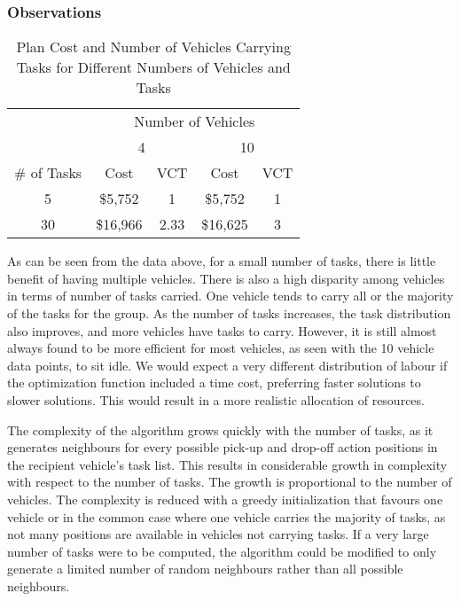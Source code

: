 \documentclass[11pt]{article}
\begin{document}
\subsubsection{Observations}


\begin{table}[]	
	\centering
	\caption{Plan Cost and Number of Vehicles Carrying Tasks for Different Numbers of Vehicles and Tasks}
	\begin{tabular}{c|c|c|c|c|}
		\cline{2-5}
		\multirow{2}{*}{} & \multicolumn{4}{c|}{Number of Vehicles} \\ \cline{2-5} 
		& \multicolumn{2}{c|}{4} & \multicolumn{2}{c|}{10} \\ \hline
		\multicolumn{1}{|c|}{\# of Tasks} & Cost & VCT & Cost & VCT \\ \hline
		\multicolumn{1}{|c|}{5} & \$5,752 & 1 & \$5,752 & 1 \\ \hline
		\multicolumn{1}{|c|}{30} & \$16,966 & 2.33 & \$16,625 & 3 \\ \hline
	\end{tabular}
\end{table}

As can be seen from the data above, for a small number of tasks, there is little benefit of having multiple vehicles. There is also a high disparity among vehicles in terms of number of tasks carried. One vehicle tends to carry all or the majority of the tasks for the group. As the number of tasks increases, the task distribution also improves, and more vehicles have tasks to carry. However, it is still almost always found to be more efficient for most vehicles, as seen with the 10 vehicle data points, to sit idle. We would expect a very different distribution of labour if the optimization function included a time cost, preferring faster solutions to slower solutions. This would result in a more realistic allocation of resources. 

The complexity of the algorithm grows quickly with the number of tasks, as it generates neighbours for every possible pick-up and drop-off action positions in the recipient vehicle's task list. This results in considerable growth in complexity with respect to the number of tasks. The growth is proportional to the number of vehicles. The complexity is reduced with a greedy initialization that favours one vehicle or in the common case where one vehicle carries the majority of tasks, as not many positions are available in vehicles not carrying tasks. If a very large number of tasks were to be computed, the algorithm could be modified to only generate a limited number of random neighbours rather than all possible neighbours. 
\end{document}
